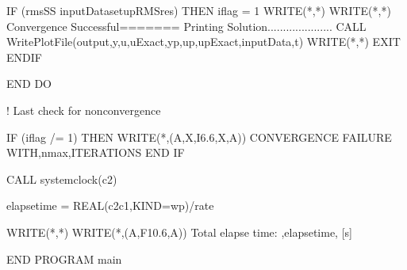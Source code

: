 \documentclass[letterpaper,10pt,english]{sphinxmanual}
\begin{document}
\begin{sphinxVerbatim}[commandchars=\\\{\}]
        IF (rms\PYGZus{}SS \PYGZlt{} inputData\PYGZpc{}setup\PYGZpc{}RMSres) THEN
                iflag = 1
                WRITE(*,*) \PYGZsq{}\PYGZhy{}\PYGZhy{}\PYGZhy{}\PYGZhy{}\PYGZhy{}\PYGZhy{}\PYGZhy{}\PYGZhy{}\PYGZhy{}\PYGZhy{}\PYGZhy{}\PYGZhy{}\PYGZhy{}\PYGZhy{}\PYGZhy{}\PYGZhy{}\PYGZhy{}\PYGZhy{}\PYGZhy{}\PYGZhy{}\PYGZhy{}\PYGZhy{}\PYGZhy{}\PYGZhy{}\PYGZhy{}\PYGZhy{}\PYGZhy{}\PYGZhy{}\PYGZhy{}\PYGZhy{}\PYGZhy{}\PYGZhy{}\PYGZhy{}\PYGZhy{}\PYGZhy{}\PYGZhy{}\PYGZhy{}\PYGZhy{}\PYGZhy{}\PYGZhy{}\PYGZhy{}\PYGZhy{}\PYGZhy{}\PYGZhy{}\PYGZhy{}\PYGZhy{}\PYGZhy{}\PYGZhy{}\PYGZhy{}\PYGZhy{}\PYGZhy{}\PYGZhy{}\PYGZhy{}\PYGZhy{}\PYGZhy{}\PYGZhy{}\PYGZhy{}\PYGZhy{}\PYGZhy{}\PYGZhy{}\PYGZhy{}\PYGZhy{}\PYGZhy{}\PYGZhy{}\PYGZhy{}\PYGZhy{}\PYGZhy{}\PYGZhy{}\PYGZhy{}\PYGZsq{}
                WRITE(*,*) \PYGZsq{}Convergence Successful=======\PYGZgt{} Printing Solution.....................\PYGZsq{}
                CALL WritePlotFile(output,\PYGZsq{}\PYGZdq{}y\PYGZdq{},\PYGZdq{}u\PYGZdq{},\PYGZdq{}uExact\PYGZdq{},\PYGZdq{}yp\PYGZdq{},\PYGZdq{}up\PYGZdq{},\PYGZdq{}upExact\PYGZdq{}\PYGZsq{},inputData,t)
                WRITE(*,*) \PYGZsq{}\PYGZhy{}\PYGZhy{}\PYGZhy{}\PYGZhy{}\PYGZhy{}\PYGZhy{}\PYGZhy{}\PYGZhy{}\PYGZhy{}\PYGZhy{}\PYGZhy{}\PYGZhy{}\PYGZhy{}\PYGZhy{}\PYGZhy{}\PYGZhy{}\PYGZhy{}\PYGZhy{}\PYGZhy{}\PYGZhy{}\PYGZhy{}\PYGZhy{}\PYGZhy{}\PYGZhy{}\PYGZhy{}\PYGZhy{}\PYGZhy{}\PYGZhy{}\PYGZhy{}\PYGZhy{}\PYGZhy{}\PYGZhy{}\PYGZhy{}\PYGZhy{}\PYGZhy{}\PYGZhy{}\PYGZhy{}\PYGZhy{}\PYGZhy{}\PYGZhy{}\PYGZhy{}\PYGZhy{}\PYGZhy{}\PYGZhy{}\PYGZhy{}\PYGZhy{}\PYGZhy{}\PYGZhy{}\PYGZhy{}\PYGZhy{}\PYGZhy{}\PYGZhy{}\PYGZhy{}\PYGZhy{}\PYGZhy{}\PYGZhy{}\PYGZhy{}\PYGZhy{}\PYGZhy{}\PYGZhy{}\PYGZhy{}\PYGZhy{}\PYGZhy{}\PYGZhy{}\PYGZhy{}\PYGZhy{}\PYGZhy{}\PYGZhy{}\PYGZhy{}\PYGZsq{}
                EXIT
        ENDIF

       END DO

       ! Last check for non\PYGZhy{}convergence

       IF (iflag /= 1) THEN
               WRITE(*,\PYGZsq{}(A,X,I6.6,X,A)\PYGZsq{}) \PYGZsq{}CONVERGENCE FAILURE WITH\PYGZsq{},nmax,\PYGZsq{}ITERATIONS\PYGZsq{}
       END IF

      CALL system\PYGZus{}clock(c2)

      elapse\PYGZus{}time = REAL(c2\PYGZhy{}c1,KIND=wp)/rate

      WRITE(*,*) \PYGZdq{}\PYGZdq{}
      WRITE(*,\PYGZsq{}(A,F10.6,A)\PYGZsq{}) \PYGZdq{}\textbar{} Total elapse time: \PYGZdq{},elapse\PYGZus{}time, \PYGZdq{} [s]\textbar{}\PYGZdq{}

END PROGRAM main
\end{sphinxVerbatim}
\end{document}

